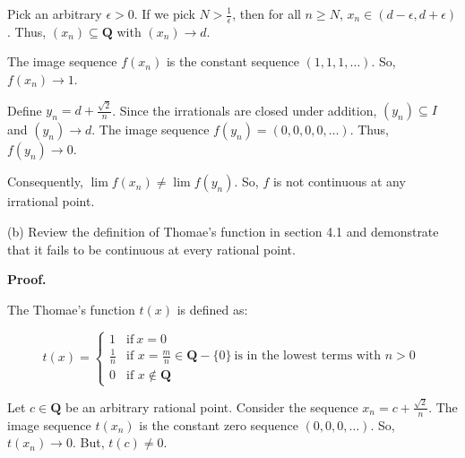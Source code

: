 \documentclass[10pt]{article}
\begin{document}
Pick an arbitrary $\displaystyle \epsilon  >0$. If we pick $\displaystyle N >\frac{1}{\epsilon }$, then for all $\displaystyle n\geq N$, $\displaystyle x_{n} \in ( d-\epsilon ,d+\epsilon )$. Thus, $\displaystyle ( x_{n}) \subseteq \mathbf{Q}$ with $\displaystyle ( x_{n})\rightarrow d$. 



The image sequence $\displaystyle f( x_{n})$ is the constant sequence $\displaystyle ( 1,1,1,\dotsc )$. So, $\displaystyle f( x_{n})\rightarrow 1$.



Define $\displaystyle y_{n} =d+\frac{\sqrt{2}}{n}$. Since the irrationals are closed under addition, $\displaystyle ( y_{n}) \subseteq I$ and $\displaystyle ( y_{n})\rightarrow d$. The image sequence $\displaystyle f( y_{n}) =( 0,0,0,0,\dotsc )$. Thus, $\displaystyle f( y_{n})\rightarrow 0$.





Consequently, $\displaystyle \lim f( x_{n}) \neq \lim f( y_{n})$. So, $\displaystyle f$ is not continuous at any irrational point.



(b) Review the definition of Thomae's function in section 4.1 and demonstrate that it fails to be continuous at every rational point.



\textbf{Proof.}



The Thomae's function $\displaystyle t( x)$ is defined as:




\begin{equation*}
t( x) =\begin{cases}
1 & \text{if} \ x=0\\
\frac{1}{n} & \text{if } x=\frac{m}{n} \in \mathbf{Q} -\{0\} \ \text{is in the lowest terms with } n >0\ \\
0 & \text{if } x\notin \mathbf{Q}
\end{cases}
\end{equation*}


Let $\displaystyle c\in \mathbf{Q}$ be an arbitrary rational point. Consider the sequence $\displaystyle x_{n} =c+\frac{\sqrt{2}}{n}$. The image sequence $\displaystyle t( x_{n})$ is the constant zero sequence $\displaystyle ( 0,0,0,\dotsc )$. So, $\displaystyle t( x_{n})\rightarrow 0$. But, $\displaystyle t( c) \neq 0$. 
\end{document}
